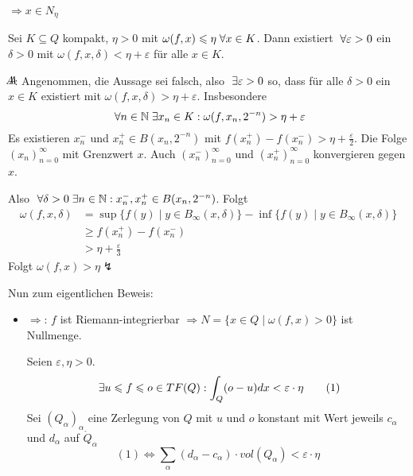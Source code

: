 \documentclass[main.tex]{subfiles}
\begin{document}
\begin{Beweis}
\begin{Beweis}[Folgenkriterium]
    $\Rightarrow x \in N_\eta$
  \end{Beweis}
  \begin{Lemma}
    Sei $K \subseteq Q$ kompakt, $\eta > 0$ mit $\omega(f,x) \leqslant \eta \;\forall x \in K$. Dann existiert $\;\forall \varepsilon > 0$ ein $\delta > 0$ mit $\omega(f,x,\delta) < \eta + \varepsilon$ für alle $x \in K$.
  \end{Lemma}
  \begin{Beweis}
    $A\hspace{-1em}A$: Angenommen, die Aussage sei falsch, also $\;\exists \varepsilon > 0$ so, dass für alle $\delta > 0$ ein $x \in K$ existiert mit $\omega(f,x,\delta) > \eta + \varepsilon$. Insbesondere
    $$\;\forall n \in \mathbb{N} \;\exists x_n \in K : \omega(f,x_n,2^{-n}) > \eta + \varepsilon$$
    Es existieren $x_n^-$ und $x_n^+ \in B(x_n,2^{-n})$ mit $f(x_n^+) - f(x_n^-) > \eta + \frac{\varepsilon}{2}$. Die Folge $(x_n)_{n=0}^\infty$ mit Grenzwert $x$. Auch $(x_n^-)_{n=0}^\infty$ und $(x_n^+)_{n=0}^\infty$ konvergieren gegen $x$.

    Also $\;\forall \delta > 0 \;\exists n \in \mathbb{N} : x_n^-, x_n^+ \in B(x_n,2^{-n})$. Folgt
    $$\begin{aligned}
      \omega(f,x,\delta) & = \sup\{f(y) \mid y \in B_\infty(x,\delta)\} - \inf\{f(y) \mid y \in B_\infty(x,\delta)\} \\
      & \geq f(x_n^+) - f(x_n^-) \\
      & > \eta + \frac{\varepsilon}{3}
    \end{aligned}$$
    Folgt $\omega(f,x) > \eta \lightning$
  \end{Beweis}
  Nun zum eigentlichen Beweis:
  \begin{itemize}
    \item $\Rightarrow$: $f$ ist Riemann-integrierbar $\Rightarrow N = \{x \in Q \mid \omega(f,x) > 0\}$ ist Nullmenge.

    Seien $\varepsilon,\eta > 0$.
    \[\;\exists u \leqslant f \leqslant o \in TF(Q) : \int_Q (o-u)dx < \varepsilon \cdot \eta \tag{1}\]
    Sei $(Q_\alpha)_\alpha$ eine Zerlegung von $Q$ mit $u$ und $o$ konstant mit Wert jeweils $c_\alpha$ und $d_\alpha$ auf $\mathring{Q}_\alpha$
    $$(1) \Leftrightarrow \sum \limits_{\alpha} (d_\alpha - c_\alpha) \cdot vol(Q_\alpha) < \varepsilon \cdot \eta $$


\end{itemize}
\end{Beweis}
\end{document}
